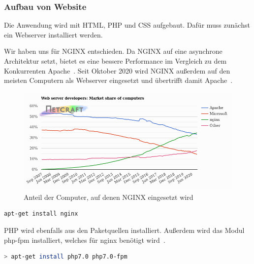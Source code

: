 \subsubsection{Aufbau von Website}
Die Anwendung wird mit HTML, PHP und CSS aufgebaut.
Dafür muss zunächst ein Webserver installiert werden.


Wir haben uns für NGINX entschieden.
Da NGINX auf eine asynchrone Architektur setzt, bietet es eine bessere Performance im Vergleich zu dem Konkurrenten Apache~\cite{NginxVsApache}.
Seit Oktober 2020 wird NGINX außerdem auf den meisten Computern als Webserver eingesetzt und übertrifft damit Apache~\cite{WebServerSurvey}.

\begin{figure}[H]
    \includegraphics[width=1\textwidth]{img/NGINX.png}
    \caption{Anteil der Computer, auf denen NGINX eingesetzt wird~\cite{WebServerSurvey}}\label{fig:figure}
\end{figure}


\begin{lstlisting}[language=Bash, caption=Installation von NGINX,label={lst:nginxinstall}]
apt-get install nginx
\end{lstlisting}
\vspace{5mm}


PHP wird ebenfalls aus den Paketquellen installiert.
Außerdem wird das Modul php-fpm installiert, welches für nginx benötigt wird~\cite{InstallNginxPHP}.

\begin{lstlisting}[language=Bash, caption=PHP und PHP-FPM installation,label={lst:installphpphpfpm}]
> apt-get install php7.0 php7.0-fpm
\end{lstlisting}
\vspace{5mm}

